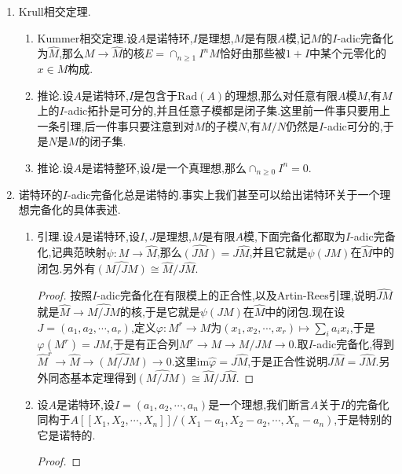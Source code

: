 \begin{enumerate}
\begin{enumerate}[(1)]
\begin{proof}
    		按照理想准则,需要验证对任意理想$J$,有$J\otimes_A\widehat{A}\to\widehat{A}$是单射.但是上一条我们证明了$J\otimes_A\widehat{A}=\widehat{J}$,正合性里我们证明了$\widehat{J}\to\widehat{A}$是单射($A$作为$A$模是有限的,于是可用正合性那条的结论).
    	\end{proof}
    \end{enumerate}
    \item Krull相交定理.
    \begin{enumerate}[(1)]
    	\item Kummer相交定理.设$A$是诺特环,$I$是理想,$M$是有限$A$模,记$M$的$I$-adic完备化为$\widehat{M}$,那么$M\to\widehat{M}$的核$E=\cap_{n\ge1}I^nM$恰好由那些被$1+I$中某个元零化的$x\in M$构成.
    	\item 推论.设$A$是诺特环,$I$是包含于$\mathrm{Rad}(A)$的理想,那么对任意有限$A$模$M$,有$M$上的$I$-adic拓扑是可分的,并且任意子模都是闭子集.这里前一件事只要用上一条引理,后一件事只要注意到对$M$的子模$N$,有$M/N$仍然是$I$-adic可分的,于是$N$是$M$的闭子集.
    	\item 推论.设$A$是诺特整环,设$I$是一个真理想,那么$\cap_{n\ge0}I^n=0$.
    \end{enumerate}
    \item 诺特环的$I$-adic完备化总是诺特的.事实上我们甚至可以给出诺特环关于一个理想完备化的具体表述.
    \begin{enumerate}[(1)]
    	\item 引理.设$A$是诺特环,设$I,J$是理想,$M$是有限$A$模,下面完备化都取为$I$-adic完备化,记典范映射$\psi:M\to\widehat{M}$,那么$\widehat{(JM)}=J\widehat{M}$,并且它就是$\psi(JM)$在$\widehat{M}$中的闭包.另外有$\widehat{(M/JM)}\cong\widehat{M}/J\widehat{M}$.
    	\begin{proof}
    		
    		按照$I$-adic完备化在有限模上的正合性,以及Artin-Rees引理,说明$\widehat{JM}$就是$\widehat{M}\to\widehat{M/JM}$的核,于是它就是$\psi(JM)$在$\widehat{M}$中的闭包.现在设$J=(a_1,a_2,\cdots,a_r)$,定义$\varphi:M^r\to M$为$(x_1,x_2,\cdots,x_r)\mapsto\sum_ia_ix_i$,于是$\varphi(M^r)=JM$,于是有正合列$M^r\to M\to M/JM\to0$.取$I$-adic完备化,得到$\widehat{M}^r\to\widehat{M}\to\widehat{(M/JM)}\to0$.这里$\mathrm{im}\widehat{\varphi}=J\widehat{M}$,于是正合性说明$J\widehat{M}=\widehat{JM}$.另外同态基本定理得到$\widehat{(M/JM)}\cong\widehat{M}/J\widehat{M}$.
    	\end{proof}
    	\item 设$A$是诺特环,设$I=(a_1,a_2,\cdots,a_n)$是一个理想,我们断言$A$关于$I$的完备化同构于$A[[X_1,X_2,\cdots,X_n]]/(X_1-a_1,X_2-a_2,\cdots,X_n-a_n)$,于是特别的它是诺特的.
    	\begin{proof}
    		

\end{proof}
\end{enumerate}
\end{enumerate}
